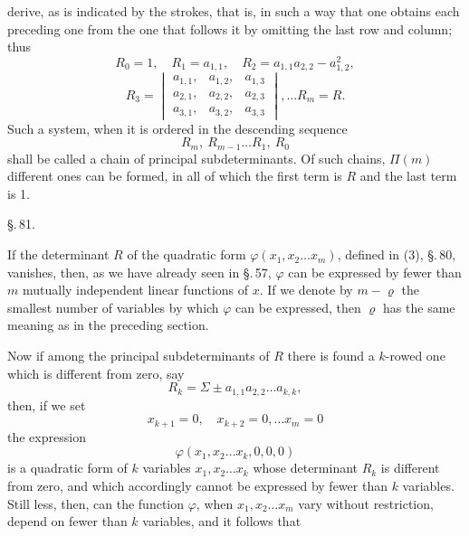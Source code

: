 derive, as is indicated by the strokes, that is, in such a way that
one obtains each preceding one from the one that follows it by
omitting the last row and column; thus
\[
R_0 = 1, \quad R_1 = a_{1,1}, \quad R_2 = a_{1,1}a_{2,2} - a_{1,2}^2,
\]
\[
R_3 = \begin{vmatrix} a_{1,1}, & a_{1,2}, & a_{1,3} \\ a_{2,1}, & a_{2,2}, & a_{2,3} \\ a_{3,1}, & a_{3,2}, & a_{3,3} \end{vmatrix}, \ldots R_m = R.
\]
Such a system, when it is ordered in the descending sequence
\[
R_m,\ R_{m-1} \ldots R_1,\ R_0
\]
shall be called a chain of principal subdeterminants.
Of such chains, $\Pi(m)$ different ones can be formed, in all of
which the first term is $R$ and the last term is 1.

\begin{center}
\S.\,81.

\end{center}

If the determinant $R$ of the quadratic form
$\varphi(x_1, x_2 \ldots x_m)$, defined in (3), \S.\,80, vanishes, then, as we
have already seen in \S.\,57, $\varphi$ can be expressed by fewer than $m$
mutually independent linear functions of $x$. If we denote by
$m - \varrho$ the smallest number of variables by which $\varphi$ can be
expressed, then $\varrho$ has the same meaning as in the preceding
section.

Now if among the principal subdeterminants of $R$ there is
found a $k$-rowed one which is different from zero, say
\[
R_k = \Sigma \pm a_{1,1}a_{2,2} \ldots a_{k,k},
\]
then, if we set
\[
x_{k+1} = 0,\quad x_{k+2} = 0, \ldots x_m = 0
\]
the expression
\[
\varphi(x_1, x_2 \ldots x_k, 0, 0, 0)
\]
is a quadratic form of $k$ variables $x_1, x_2 \ldots x_k$ whose
determinant $R_k$ is different from zero, and which accordingly cannot
be expressed by fewer than $k$ variables. Still less, then, can the
function $\varphi$, when $x_1, x_2 \ldots x_m$ vary without restriction,
depend on fewer than $k$ variables, and it follows that
